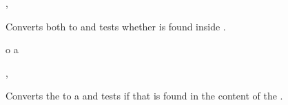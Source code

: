 \documentclass[oneside]{book}
\begin{document}
\begin{function}{\StrIfIn,\StrIfInTF}
\begin{syntax}
  
    
\end{syntax}
Converts both  to  and
tests whether  is found inside .
\begin{demohigh}
 {o} {}{}
 {a} {}{}
\end{demohigh}
\end{function}

\begin{function}{\StrVarIfIn,\StrVarIfInTF}
\begin{syntax}
  
    
\end{syntax}
Converts the  to a  and
tests if that  is found in the content of the .
\begin{demohigh}
\StrSet {}
\StrVarIfInTF {} {}{}
\StrVarIfInTF {} {}{}
\end{demohigh}
\end{function}
\end{document}
